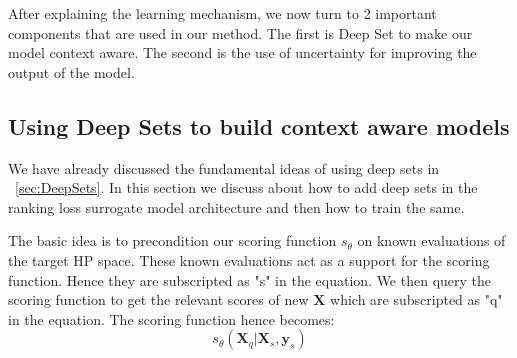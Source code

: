 \documentclass[12pt, twoside, ngerman]{report}
\begin{document}
After explaining the learning mechanism,  we now turn to 2 important components that are used in our method.
The first is Deep Set to make our model context aware.
The second is the use of uncertainty for improving the output of the model.

\subsection{Using Deep Sets to build context aware models}\label{sec:DeepSetWithModel}

We have already discussed the fundamental ideas of using deep sets in  ~\ref{sec:DeepSets}.
In this section we discuss about how to add deep sets in the ranking loss surrogate model architecture and then how to train the same.

The basic idea is to precondition our scoring function $s_{\theta}$ on known evaluations of the target HP space.
These known evaluations act as a support for the scoring function.
Hence they are subscripted as "s" in the equation.
We then query the scoring function to get the relevant scores of new $\textbf{X}$ which are subscripted as "q" in the equation.
The scoring function hence becomes:
$$
s_{\theta}(\textbf{X}_{q} | \textbf{X}_{s}, \textbf{y}_{s})
$$
\end{document}
